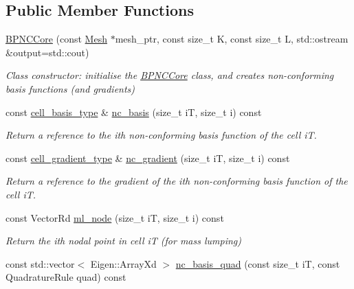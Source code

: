 \subsection*{Public Member Functions}
\begin{DoxyCompactItemize}
\item 
\hyperlink{group__BPNC_ga063bc1a24f9fbe136809f447fc25a486}{B\+P\+N\+C\+Core} (const \hyperlink{classHArDCore2D_1_1Mesh}{Mesh} $\ast$mesh\+\_\+ptr, const size\+\_\+t K, const size\+\_\+t L, std\+::ostream \&output=std\+::cout)
\begin{DoxyCompactList}\small\item\em Class constructor\+: initialise the \hyperlink{classHArDCore2D_1_1BPNCCore}{B\+P\+N\+C\+Core} class, and creates non-\/conforming basis functions (and gradients) \end{DoxyCompactList}\item 
const \hyperlink{classHArDCore2D_1_1BPNCCore_a3aa8544d9ea9ae31d70e65aaefb0e9c8}{cell\+\_\+basis\+\_\+type} \& \hyperlink{group__BPNC_ga169de49549ae3c009c54c24d72d2e0ec}{nc\+\_\+basis} (size\+\_\+t iT, size\+\_\+t i) const
\begin{DoxyCompactList}\small\item\em Return a reference to the i\textquotesingle{}th non-\/conforming basis function of the cell iT. \end{DoxyCompactList}\item 
const \hyperlink{classHArDCore2D_1_1BPNCCore_a3e1f027c19acfc768851fbdbb00f2eec}{cell\+\_\+gradient\+\_\+type} \& \hyperlink{group__BPNC_ga967af6ae54aa35135ab8edb9cb94f1cf}{nc\+\_\+gradient} (size\+\_\+t iT, size\+\_\+t i) const
\begin{DoxyCompactList}\small\item\em Return a reference to the gradient of the i\textquotesingle{}th non-\/conforming basis function of the cell iT. \end{DoxyCompactList}\item 
const Vector\+Rd \hyperlink{group__BPNC_ga554c5835189ff791d8db8f0e31c222dd}{ml\+\_\+node} (size\+\_\+t iT, size\+\_\+t i) const
\begin{DoxyCompactList}\small\item\em Return the i\textquotesingle{}th nodal point in cell iT (for mass lumping) \end{DoxyCompactList}\item 
const std\+::vector$<$ Eigen\+::\+Array\+Xd $>$ \hyperlink{group__BPNC_gadab9f7a9f6d42f729a8dce8e358e4d00}{nc\+\_\+basis\+\_\+quad} (const size\+\_\+t iT, const Quadrature\+Rule quad) const

\end{DoxyCompactItemize}
